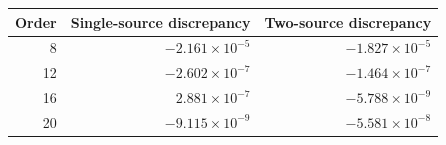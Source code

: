 \begin{tabular}{@{}rrr@{}}
\toprule
Order & Single-source discrepancy & Two-source discrepancy\\
\midrule
8 & $-2.161\times10^{-5}$ & $-1.827\times10^{-5}$\\
12 & $-2.602\times10^{-7}$ & $-1.464\times10^{-7}$\\
16 & $2.881\times10^{-7}$ & $-5.788\times10^{-9}$\\
20 & $-9.115\times10^{-9}$ & $-5.581\times10^{-8}$\\
\bottomrule
\end{tabular}
